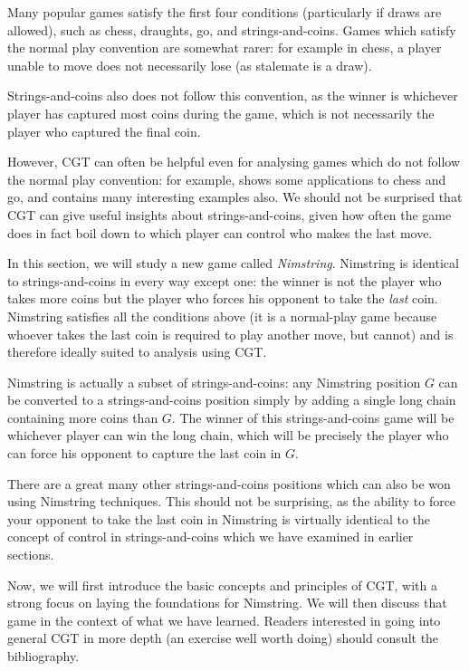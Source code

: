 \documentclass[a4paper,twocolumn]{article}
\begin{document}
Many popular games satisfy the first four conditions (particularly if
draws are allowed), such as chess, draughts, go, and
strings-and-coins. Games which satisfy the normal play convention are
somewhat rarer: for example in chess, a player unable to move does not
necessarily lose (as stalemate is a draw).

Strings-and-coins also does not follow this convention, as the winner
is whichever player has captured most coins during the game, which is
not necessarily the player who captured the final coin.

However, CGT can often be helpful even for analysing games which do
not follow the normal play convention: for example, \cite{nochance}
shows some applications to chess and go, and \cite{wways} contains
many interesting examples also. We should not be surprised that CGT
can give useful insights about strings-and-coins, given how often the
game does in fact boil down to which player can control who makes the
last move.

In this section, we will study a new game called
\emph{Nimstring}. Nimstring is identical to strings-and-coins in every
way except one: the winner is not the player who takes more coins but
the player who forces his opponent to take the \emph{last}
coin. Nimstring satisfies all the conditions above (it is a
normal-play game because whoever takes the last coin is required to
play another move, but cannot) and is therefore ideally suited to
analysis using CGT.

Nimstring is actually a subset of strings-and-coins: any Nimstring
position $G$ can be converted to a strings-and-coins position simply
by adding a single long chain containing more coins than $G$. The
winner of this strings-and-coins game will be whichever player can win
the long chain, which will be precisely the player who can force his
opponent to capture the last coin in $G$.

There are a great many other strings-and-coins positions which can
also be won using Nimstring techniques. This should not be surprising,
as the ability to force your opponent to take the last coin in
Nimstring is virtually identical to the concept of control in
strings-and-coins which we have examined in earlier sections.

Now, we will first introduce the basic concepts and principles of CGT,
with a strong focus on laying the foundations for Nimstring. We will
then discuss that game in the context of what we have learned. Readers
interested in going into general CGT in more depth (an exercise well
worth doing) should consult the bibliography.
\end{document}
